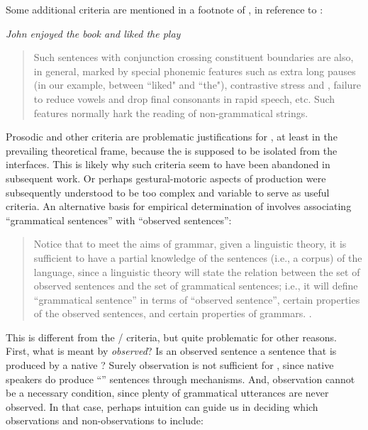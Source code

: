 Some additional  criteria are mentioned in a footnote of \citet{Chomsky1957}, in reference to :

\ea\label{ex:6:4}
\textit{John enjoyed the book and liked the play}
\z

\begin{quote}
Such sentences with conjunction crossing constituent boundaries are also, in general, marked by special phonemic features such as extra long pauses (in our example, between ``liked" and ``the"), contrastive stress and , failure to reduce vowels and drop final consonants in rapid speech, etc. Such features normally hark the reading of non-grammatical strings. \citep[35-36]{Chomsky1957}
\end{quote}

Prosodic and other  criteria are problematic justifications for , at least in the prevailing theoretical frame, because the  is supposed to be isolated from the  interfaces. This is likely why such criteria seem to have been abandoned in subsequent work. Or perhaps gestural-motoric aspects of production were subsequently understood to be too complex and variable to serve as useful criteria. An alternative basis for empirical determination of  involves associating “grammatical sentences” with “observed sentences”:

\begin{quote}	
  Notice that to meet the aims of grammar, given a linguistic theory, it is sufficient to have a partial knowledge of the sentences (i.e., a corpus) of the language, since a linguistic theory will state the relation between the set of observed sentences and the set of grammatical sentences; i.e., it will define “grammatical sentence” in terms of “observed sentence”, certain properties of the observed sentences, and certain properties of grammars. \citep[14]{Chomsky1957}.
\end{quote}

  This is different from the / criteria, but quite problematic for other reasons. First, what is meant by \textit{observed}? Is an observed sentence a sentence that is produced by a native ? Surely observation is not sufficient for , since native speakers do produce “” sentences through  mechanisms. And, observation cannot be a necessary condition, since plenty of grammatical utterances are never observed. In that case, perhaps intuition can guide us in deciding which observations and non-observations to include:
  
